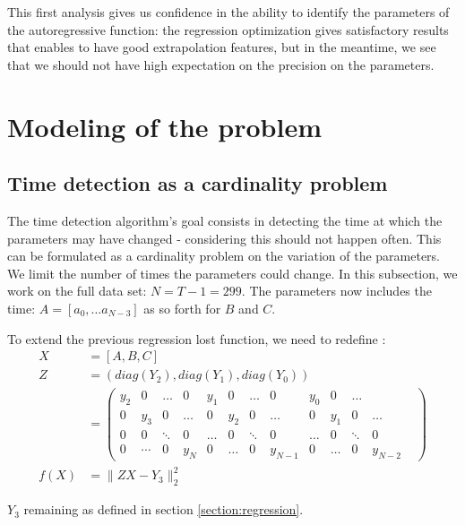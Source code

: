 \documentclass[11pt]{article}
\begin{document}
    This first analysis gives us confidence in the ability to identify the parameters of the autoregressive function: the regression optimization gives satisfactory results that enables to have good extrapolation features, but in the meantime, we see that we should not have high expectation on the precision on the parameters.

\section{Modeling of the problem}
    \subsection{Time detection as a cardinality problem}
        The time detection algorithm's goal consists in detecting the time at which the parameters may have changed - considering this should not happen often. This can be formulated as a cardinality problem on the variation of the parameters. We limit the number of times the parameters could change.
        In this subsection, we work on the full data set: $N = T-1 = 299$. The parameters now includes the time: $A=[a_0, \ldots a_{N-3}]$ as so forth for $B$ and $C$.
        
        To extend the previous regression lost function, we need to redefine :
        \begin{equation*}
            \begin{aligned}
                X &= [A, B, C] \\
                Z &= (diag(Y_2), diag(Y_1), diag(Y_0))\\
                &= \begin{pmatrix} 
                    y_2 & 0 & \ldots & 0 & y_1 & 0 & \ldots & 0 & y_0 & 0 & \ldots \\
                    0 & y_3 & 0 & \ldots & 0 & y_2 & 0 & \ldots & 0 & y_1 & 0 & \ldots \\
                    0 & 0 & \ddots & 0 & \ldots & 0 & \ddots & 0 & \ldots & 0 & \ddots & 0 & \\
                    0 & \cdots & 0 & y_{N} & 0 & \ldots & 0 & y_{N-1} & 0 & \ldots & 0 & y_{N-2}
                \end{pmatrix} \\
                f (X) &= \lVert ZX - Y_3 \rVert^2_2
            \end{aligned}
        \end{equation*}

        $Y_3$ remaining as defined in section \ref{section:regression}. 
        
\end{document}
